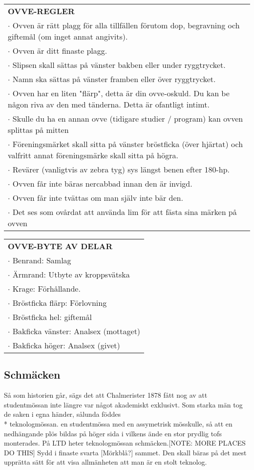 \begin{tabular}{p{\textwidth}}
    \textbf{OVVE-REGLER}\\
    $\cdot$ Ovven är rätt plagg för alla tillfällen förutom dop, begravning och giftemål (om inget annat angivits).\\
    $\cdot$ Ovven är ditt finaste plagg.\\
    $\cdot$ Slipsen skall sättas på vänster bakben eller under ryggtrycket.\\
    $\cdot$ Namn ska sättas på vänster framben eller över ryggtrycket.\\
    $\cdot$ Ovven har en liten "flärp", detta är din ovve-oskuld. Du kan be någon riva av den med tänderna. Detta är ofantligt intimt.\\
    $\cdot$ Skulle du ha en annan ovve (tidigare studier / program) kan ovven splittas på mitten\\
    $\cdot$ Föreningsmärket skall sitta på vänster bröstficka (över hjärtat) och valfritt annat föreningsmärke skall sitta på högra.\\
    $\cdot$ Revärer (vanligtvis av zebra tyg) sys längst benen efter 180-hp.\\
    $\cdot$ Ovven får inte bäras nercabbad innan den är invigd.\\
    $\cdot$ Ovven får inte tvättas om man själv inte bär den.\\
    $\cdot$ Det ses som ovårdat att använda lim för att fästa sina märken på ovven\\
\end{tabular}
\begin{tabular}{p{\textwidth}}
    \textbf{OVVE-BYTE AV DELAR} \\
    $\cdot$ Benrand: Samlag\\
    $\cdot$ Ärmrand: Utbyte av kroppsvätska\\
    $\cdot$ Krage: Förhållande.\\
    $\cdot$ Bröstficka flärp: Förlovning \\
    $\cdot$ Bröstficka hel: giftemål\\
    $\cdot$ Bakficka vänster: Analsex (mottaget)\\
    $\cdot$ Bakficka höger: Analsex (givet)\\
\end{tabular}

\subsection*{\textbf{Schmäcken}}
Så som historien går, sägs det att Chalmerister 1878 fått nog av att studentmössan inte  längre var något akademiskt exklusivt.
Som starka män tog de saken i egna händer, sålunda föddes\\* teknologmössan. en studentmössa med en assymetrisk mösskulle, så att
en nedhängande plös bildas på höger sida i vilkens ände en stor prydlig tofs monterades. På LTD heter teknologmössan schmäcken.[NOTE: MORE PLACES DO THIS] Sydd i finaste svarta [Mörkblå?] sammet.
Den skall bäras på det mest upprätta sätt för att visa allmänheten att man är en stolt teknolog.

